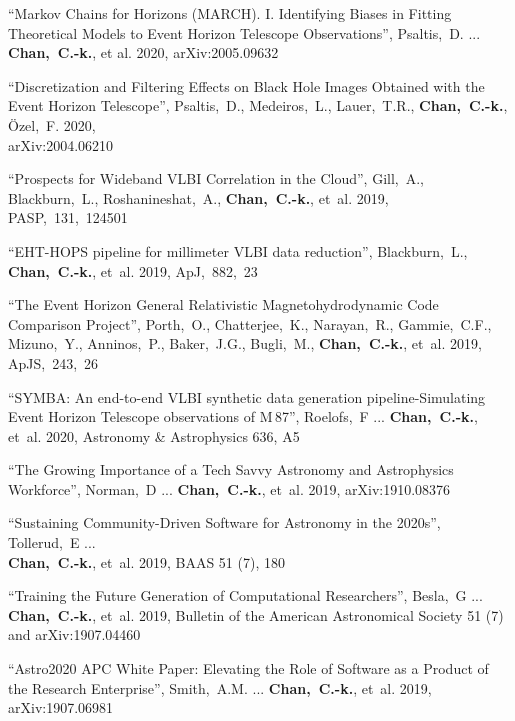 \begin{ilist}
\item ``Markov Chains for Horizons (MARCH). I. Identifying Biases in Fitting Theoretical Models to Event Horizon Telescope Observations'',
  Psaltis,~D. ... \textbf{Chan,~C.-k.}, et al.
  2020, arXiv:2005.09632

\item ``Discretization and Filtering Effects on Black Hole Images Obtained with the Event Horizon Telescope'',
  Psaltis,~D., Medeiros,~L., Lauer,~T.R., \textbf{Chan,~C.-k.}, \"Ozel,~F.
  2020,\\ arXiv:2004.06210

\item ``Prospects for Wideband VLBI Correlation in the Cloud'',
  Gill,~A., Blackburn,~L., Roshanineshat,~A., \textbf{Chan,~C.-k.}, et~al.
  2019, PASP,~131,~124501

\item ``EHT-HOPS pipeline for millimeter VLBI data reduction'',
  Blackburn,~L., \textbf{Chan,~C.-k.}, et~al.
  2019, ApJ,~882,~23

\item ``The Event Horizon General Relativistic Magnetohydrodynamic Code Comparison Project'',
  Porth,~O., Chatterjee,~K., Narayan,~R., Gammie,~C.F., Mizuno,~Y., Anninos,~P., Baker,~J.G., Bugli,~M., \textbf{Chan,~C.-k.}, et~al.
  2019, ApJS,~243,~26

\item ``SYMBA: An end-to-end VLBI synthetic data generation pipeline-Simulating Event Horizon Telescope observations of M\,87'',
  Roelofs,~F ... \textbf{Chan,~C.-k.}, et~al.
  2020, Astronomy \& Astrophysics 636, A5

\item ``The Growing Importance of a Tech Savvy Astronomy and Astrophysics Workforce'',
  Norman,~D ... \textbf{Chan,~C.-k.}, et~al.
  2019, arXiv:1910.08376 %

\item ``Sustaining Community-Driven Software for Astronomy in the 2020s'',
  Tollerud,~E ...\\ \textbf{Chan,~C.-k.}, et~al.
  2019, BAAS 51 (7), 180 %

\item ``Training the Future Generation of Computational Researchers'',
  Besla,~G ... \textbf{Chan,~C.-k.}, et~al.
  2019, Bulletin of the American Astronomical Society 51 (7) and arXiv:1907.04460 %

\item ``Astro2020 APC White Paper: Elevating the Role of Software as a Product of the Research Enterprise'',
  Smith,~A.M. ... \textbf{Chan,~C.-k.}, et~al.
  2019, arXiv:1907.06981 %


\end{ilist}
